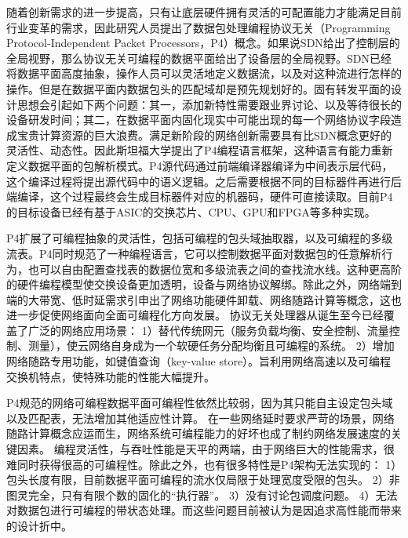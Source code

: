 随着创新需求的进一步提高，只有让底层硬件拥有灵活的可配置能力才能满足目前行业变革的需求，因此研究人员提出了数据包处理编程协议无关（Programming Protocol-Independent Packet Processors，P4）概念。如果说SDN给出了控制层的全局视野，那么协议无关可编程的数据平面给出了设备层的全局视野。SDN已经将数据平面高度抽象，操作人员可以灵活地定义数据流，以及对这种流进行怎样的操作。但是在数据平面内数据包头的匹配域却是预先规划好的。固有转发平面的设计思想会引起如下两个问题：其一，添加新特性需要跟业界讨论、以及等待很长的设备研发时间；其二，在数据平面内固化现实中可能出现的每一个网络协议字段造成宝贵计算资源的巨大浪费。满足新阶段的网络创新需要具有比SDN概念更好的灵活性、动态性。因此斯坦福大学提出了P4编程语言框架，这种语言有能力重新定义数据平面的包解析模式。P4源代码通过前端编译器编译为中间表示层代码，这个编译过程将提出源代码中的语义逻辑。之后需要根据不同的目标器件再进行后端编译，这个过程最终会生成目标器件对应的机器码，硬件可直接读取。目前P4的目标设备已经有基于ASIC的交换芯片、CPU、GPU和FPGA等多种实现。

P4扩展了可编程抽象的灵活性，包括可编程的包头域抽取器，以及可编程的多级流表。P4同时规范了一种编程语言，它可以控制数据平面对数据包的任意解析行为，也可以自由配置查找表的数据位宽和多级流表之间的查找流水线。这种更高阶的硬件编程模型使交换设备更加透明，设备与网络协议解绑。除此之外，网络端到端的大带宽、低时延需求引申出了网络功能硬件卸载、网络随路计算等概念，这也进一步促使网络面向全面可编程化方向发展。
协议无关处理器从诞生至今已经覆盖了广泛的网络应用场景：
1）替代传统网元（服务负载均衡、安全控制、流量控制、测量），使云网络自身成为一个软硬任务分配均衡且可编程的系统。
2）增加网络随路专用功能，如键值查询（key-value store）。旨利用网络高速以及可编程交换机特点，使特殊功能的性能大幅提升。

P4规范的网络可编程数据平面可编程性依然比较弱，因为其只能自主设定包头域以及匹配表，无法增加其他适应性计算。
在一些网络延时要求严苛的场景，网络随路计算概念应运而生，网络系统可编程能力的好坏也成了制约网络发展速度的关键因素。
编程灵活性，与吞吐性能是天平的两端，由于网络巨大的性能需求，很难同时获得很高的可编程性。除此之外，也有很多特性是P4架构无法实现的：
1）包头长度有限，目前数据平面可编程的流水仅局限于处理宽度受限的包头。
2）非图灵完全，只有有限个数的固化的“执行器”。
3）没有讨论包调度问题。
4）无法对数据包进行可编程的带状态处理。而这些问题目前被认为是因追求高性能而带来的设计折中。

\label{chap113}

